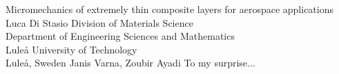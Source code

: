 \documentclass[12pt,a4paper,openright,final,twoside]{cseethesis}
\begin{document}
\def\thesistitle{Micromechanics of extremely thin composite layers for aerospace applications}
\def\theauthor{Luca Di Stasio}
\def\theaddress{Division of Materials Science\\Department of Engineering Sciences and Mathematics\\
Lule{\aa} University of Technology\\ Lule{\aa}, Sweden}

\def\supervisors{Janis Varna, Zoubir Ayadi}
\def\supervisorstring{Supervisors:} %
\def\dedication{To my surprise...}

\def\theabstract{}
\def\thepreface{}



\def\thelogo{} %


\startpreamble
  {\thesistitle}
  {\theauthor}
  {\theaddress}
  {\supervisors}
  {\dedication}
  {\theabstract}
  {\thepreface}
  {\thelogo}

\end{document}
